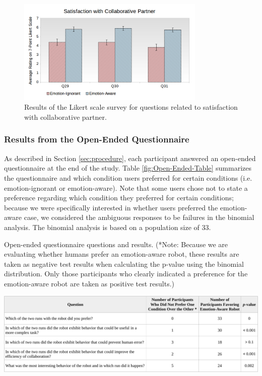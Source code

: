 \documentclass[12pt]{report}
\begin{document}
\begin{figure}
\centering
\includegraphics[width=0.8\textwidth]{figure/Overall-Satisfaction.png}
\caption{Results of the Likert scale survey for questions related to
satisfaction with collaborative partner.}
\label{fig:overall-satisfaction}
\end{figure}

\subsubsection{Results from the Open-Ended Questionnaire} 
\label{sec:Open-Ended}
As described in Section \ref{sec:procedure}, each participant answered an
open-ended questionnaire at the end of the study. Table
\ref{fig:Open-Ended-Table} summarizes the questionnaire and which condition
users preferred for certain conditions (i.e. emotion-ignorant or emotion-aware).
Note that some users chose not to state a preference regarding which condition
they preferred for certain conditions; because we were specifically interested
in whether users preferred the emotion-aware case, we considered the ambiguous
responses to be failures in the binomial analysis. The binomial analysis is
based on a population size of 33.

\begin{table}[t]
  \centering
  \caption{Open-ended questionnaire questions and results. (*Note: Because we
  are evaluating whether humans prefer an emotion-aware robot, these results are
  taken as negative test results when calculating the p-value using the binomial
  distribution. Only those participants who clearly indicated a preference for
  the emotion-aware robot are taken as positive test results.)}
  \label{fig:Open-Ended-Table}
  \vspace*{-3mm}
  \includegraphics[width=1\textwidth]{figure/table2-croped.pdf}
\end{table}
\end{document}
